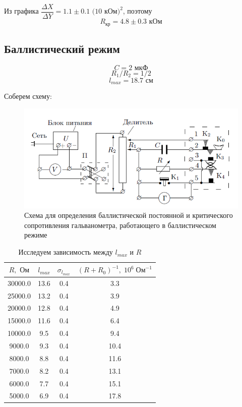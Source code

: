 \documentclass[a4paper, 12pt]{article}
\begin{document}
Из графика $\dfrac{\Delta X}{\Delta Y} = 1.1 \pm 0.1 \text{ (10 кОм)}^2$, поэтому 
$$R_\text{кр} = 4.8 \pm 0.3 \text{  кОм}$$

\subsection*{Баллистический режим}

$$C = 2 \text{ мкФ}$$
$$R_1/R_2 = 1/2$$
$$l_{max} = 18.7 \text{ см}$$

Соберем схему:

\begin {figure}[H]
	\begin{center}
		\includegraphics[width = 0.8 \textwidth]{Scheme2}
		\caption{Схема для определения баллистической постоянной и критического сопротивления гальванометра, работающего в баллистическом режиме}
	\end{center}
\end {figure}

\begin{table}[H]
\centering
\begin{tabular}{|c|c|c|c|}
\hline
$R, \text{ Ом}$ & $l_{max}$ & $\sigma_{l_{max}}$ & $(R+R_0)^{-1}, \; 10^6 \; \text{Ом}^{-1}$ \\ \hline
30000.0         & 13.6      & 0.4                & 3.3            \\ \hline
25000.0         & 13.2      & 0.4                & 3.9            \\ \hline
20000.0         & 12.8      & 0.4                & 4.9            \\ \hline
15000.0         & 11.6      & 0.4                & 6.4            \\ \hline
10000.0         & 9.5       & 0.4                & 9.4            \\ \hline
9000.0          & 9.3       & 0.4                & 10.4           \\ \hline
8000.0          & 8.8       & 0.4                & 11.6           \\ \hline
7000.0          & 8.2       & 0.4                & 13.1           \\ \hline
6000.0          & 7.7       & 0.4                & 15.1           \\ \hline
5000.0          & 6.9       & 0.4                & 17.8           \\ \hline
\end{tabular}
\caption{Исследуем зависимость между $l_{max}$ и $R$}
\end{table}
\end{document}
